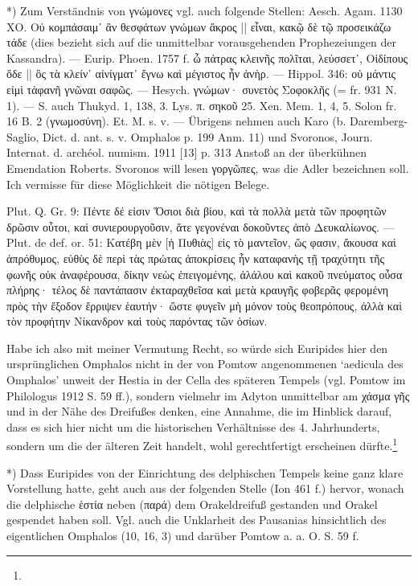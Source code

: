 \documentclass[a4paper, 11pt, oneside]{article}
\begin{document}
*) Zum Verständnis von γνώμονες vgl. auch folgende Stellen: Aesch. Agam. 1130 ΧΟ. Οὐ κομπάσαιμ᾽ ἂν θεσφάτων γνώμων ἄκρος || εἶναι, κακῷ δὲ τῷ προσεικάζω τάδε (dies bezieht sich auf die unmittelbar vorausgehenden Prophezeiungen der Kassandra). --- Eurip. Phoen. 1757 f. ὦ πάτρας κλεινῆς πολῖται, λεύσσετ᾽, Οἰδίπους ὅδε || ὃς τὰ κλείν᾽ αἰνίγματ᾽ ἔγνω καὶ μέγιστος ἦν ἀνὴρ. --- Hippol. 346: οὐ μάντις εἰμὶ τἀφανῆ γνῶναι σαφῶς. --- Hesych. γνώμων· συνετὸς Σοφοκλῆς (= fr. 931 N. 1). --- S. auch Thukyd. 1, 138, 3. Lys. π. σηκοῦ 25. Xen. Mem. 1, 4, 5. Solon fr. 16 B. 2 (γνωμοσύνη). Et. M. s. v. --- Übrigens nehmen auch Karo (b. Daremberg-Saglio, Dict. d. ant. s. v. Omphalos p. 199 Anm. 11) und Svoronos, Journ. Internat. d. archéol. numism. 1911 [13] p. 313 Anstoß an der überkühnen Emendation Roberts. Svoronos will lesen γοργῶπες, was die Adler bezeichnen soll. Ich vermisse für diese Möglichkeit die nötigen Belege.

Plut. Q. Gr. 9: Πέντε δέ εἰσιν Ὅσιοι διὰ βίου, καὶ τὰ πολλὰ μετὰ τῶν προφητῶν δρῶσιν οὗτοι, καὶ συνιερουργοῦσιν, ἅτε γεγονέναι δοκοῦντες ἀπὸ Δευκαλίωνος. --- Plut. de def. or. 51: Κατέβη μὲν [ἡ Πυθιὰς] εἰς τὸ μαντεῖον, ὥς φασιν, ἄκουσα καὶ ἀπρόθυμος, εὐθὺς δὲ περὶ τὰς πρώτας ἀποκρίσεις ἦν καταφανὴς τῇ τραχύτητι τῆς φωνῆς οὐκ ἀναφέρουσα, δίκην νεὼς ἐπειγομένης, ἀλάλου καὶ κακοῦ πνεύματος οὖσα πλήρης· τέλος δὲ παντάπασιν ἐκταραχθεῖσα καὶ μετὰ κραυγῆς φοβερᾶς φερομένη πρὸς τὴν ἔξοδον ἔρριψεν ἑαυτήν· ὥστε φυγεῖν μὴ μόνον τοὺς θεοπρόπους, ἀλλὰ καὶ τὸν προφήτην Νίκανδρον καὶ τοὺς παρόντας τῶν ὁσίων.

Habe ich also mit meiner Vermutung Recht, so würde sich Euripides hier den ursprünglichen Omphalos nicht in der von Pomtow angenommenen `aedicula des Omphalos' unweit der Hestia in der Cella des späteren Tempels (vgl. Pomtow im Philologus 1912 S. 59 ff.), sondern vielmehr im Adyton unmittelbar am χάσμα γῆς und in der Nähe des Dreifußes denken, eine Annahme, die im Hinblick darauf, dass es sich hier nicht um die historischen Verhältnisse des 4. Jahrhunderts, sondern um die der älteren Zeit handelt, wohl gerechtfertigt erscheinen dürfte.\footnote{}

*) Dass Euripides von der Einrichtung des delphischen Tempels keine ganz klare Vorstellung hatte, geht auch aus der folgenden Stelle (Ion 461 f.) hervor, wonach die delphische ἑστία neben (παρά) dem Orakeldreifuß gestanden und Orakel gespendet haben soll. Vgl. auch die Unklarheit des Pausanias hinsichtlich des eigentlichen Omphalos (10, 16, 3) und darüber Pomtow a. a. O. S. 59 f.
\end{document}
